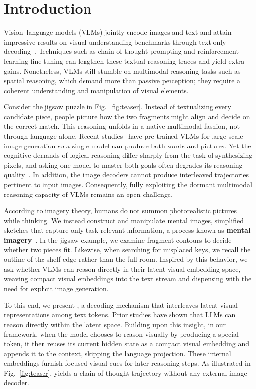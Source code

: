 \section{Introduction}


Vision–language models (VLMs) jointly encode images and text and attain impressive results on visual-understanding benchmarks through text-only decoding~\citep{wang2024qwen2}. Techniques such as chain-of-thought prompting and reinforcement-learning fine-tuning can lengthen these textual reasoning traces and yield extra gains.
Nonetheless, VLMs still stumble on multimodal reasoning tasks such as spatial reasoning, which demand more than passive perception; they require a coherent understanding and manipulation of visual elements.

Consider the jigsaw puzzle in Fig.~\ref{fig:teaser}.
Instead of textualizing every candidate piece, people picture how the two fragments might align and decide on the correct match.
This reasoning unfolds in a native multimodal fashion, not through language alone.
Recent studies~\citep{team2024chameleon,tong2024metamorph,chern2024anole,chen2025blip3} have pre-trained VLMs for large-scale image generation so a single model can produce both words and pictures.
Yet the cognitive demands of logical reasoning differ sharply from the task of synthesizing pixels, and asking one model to master both goals often degrades its reasoning quality~\citep{wang2025autoregressive}.
In addition, the image decoders cannot produce interleaved trajectories pertinent to input images.
Consequently, fully exploiting the dormant multimodal reasoning capacity of VLMs remains an open challenge.

According to imagery theory, humans do not summon photorealistic pictures while thinking. We instead construct and manipulate mental images, simplified sketches that capture only task-relevant information, a process known as \textbf{mental imagery}~\citep{shepard1971mental, farah1985psychophysical, kosslyn1996image}. In the jigsaw example, we examine fragment contours to decide whether two pieces fit. Likewise, when searching for misplaced keys, we recall the outline of the shelf edge rather than the full room. Inspired by this behavior, we ask whether VLMs can reason directly in their latent visual embedding space, weaving compact visual embeddings into the text stream and dispensing with the need for explicit image generation.

To this end, we present \textbf{\Model}, a decoding mechanism that interleaves latent visual representations among text tokens.
Prior studies have shown that LLMs can reason directly within the latent space. Building upon this insight, in our \Model framework, when the model chooses to reason visually by producing a special token, it then reuses its current hidden state as a compact visual embedding and appends it to the context, skipping the language projection. These internal embeddings furnish focused visual cues for later reasoning steps. As illustrated in Fig.~\ref{fig:teaser}, \Model yields a chain-of-thought trajectory without any external image decoder.

